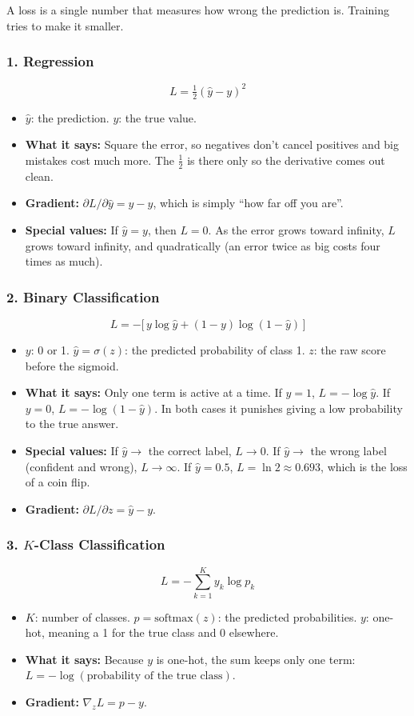 A loss is a single number that measures how wrong the prediction is. Training tries to make it smaller.

\subsubsection*{1. Regression}
\[
L = \tfrac{1}{2}(\hat{y} - y)^2
\]
\begin{itemize}
  \item $\hat{y}$: the prediction. $y$: the true value.
  \item \textbf{What it says:} Square the error, so negatives don't cancel positives and big mistakes cost much more. The $\tfrac12$ is there only so the derivative comes out clean.
  \item \textbf{Gradient:} $\partial L/\partial \hat{y} = \hat{y} - y$, which is simply ``how far off you are''.
  \item \textbf{Special values:} If $\hat{y} = y$, then $L = 0$. As the error grows toward infinity, $L$ grows toward infinity, and quadratically (an error twice as big costs four times as much).
\end{itemize}

\subsubsection*{2. Binary Classification}
\[
L = -\big[\, y \log \hat{y} + (1-y)\log(1-\hat{y}) \,\big]
\]
\begin{itemize}
  \item $y$: 0 or 1. $\hat{y} = \sigma(z)$: the predicted probability of class 1. $z$: the raw score before the sigmoid.
  \item \textbf{What it says:} Only one term is active at a time. If $y=1$, $L = -\log \hat{y}$. If $y = 0$, $L = -\log(1-\hat{y})$. In both cases it punishes giving a low probability to the true answer.
  \item \textbf{Special values:} If $\hat{y} \to$ the correct label, $L \to 0$. If $\hat{y} \to$ the wrong label (confident and wrong), $L \to \infty$. If $\hat{y} = 0.5$, $L = \ln 2 \approx 0.693$, which is the loss of a coin flip.
  \item \textbf{Gradient:} $\partial L/\partial z = \hat{y} - y$.
\end{itemize}

\subsubsection*{3. $K$-Class Classification}
\[
L = -\sum_{k=1}^{K} y_k \log p_k
\]
\begin{itemize}
  \item $K$: number of classes. $p = \mathrm{softmax}(z)$: the predicted probabilities. $y$: one-hot, meaning a 1 for the true class and 0 elsewhere.
  \item \textbf{What it says:} Because $y$ is one-hot, the sum keeps only one term: $L = -\log(\text{probability of the true class})$.
  \item \textbf{Gradient:} $\nabla_z L = p - y$.
\end{itemize}

